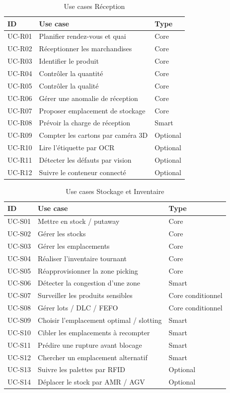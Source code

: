 \begin{longtable}{p{2.2cm}p{9.2cm}p{3cm}}
\caption{Use cases Réception}\\
\toprule
ID & Use case & Type \\
\midrule
UC-R01 & Planifier rendez-vous et quai & Core \\
UC-R02 & Réceptionner les marchandises & Core \\
UC-R03 & Identifier le produit & Core \\
UC-R04 & Contrôler la quantité & Core \\
UC-R05 & Contrôler la qualité & Core \\
UC-R06 & Gérer une anomalie de réception & Core \\
UC-R07 & Proposer emplacement de stockage & Core \\
UC-R08 & Prévoir la charge de réception & Smart \\
UC-R09 & Compter les cartons par caméra 3D & Optional \\
UC-R10 & Lire l'étiquette par OCR & Optional \\
UC-R11 & Détecter les défauts par vision & Optional \\
UC-R12 & Suivre le conteneur connecté & Optional \\
\bottomrule
\end{longtable}

\begin{longtable}{p{2.2cm}p{9.2cm}p{3cm}}
\caption{Use cases Stockage et Inventaire}\\
\toprule
ID & Use case & Type \\
\midrule
UC-S01 & Mettre en stock / putaway & Core \\
UC-S02 & Gérer les stocks & Core \\
UC-S03 & Gérer les emplacements & Core \\
UC-S04 & Réaliser l'inventaire tournant & Core \\
UC-S05 & Réapprovisionner la zone picking & Core \\
UC-S06 & Détecter la congestion d'une zone & Smart \\
UC-S07 & Surveiller les produits sensibles & Core conditionnel \\
UC-S08 & Gérer lots / DLC / FEFO & Core conditionnel \\
UC-S09 & Choisir l'emplacement optimal / slotting & Smart \\
UC-S10 & Cibler les emplacements à recompter & Smart \\
UC-S11 & Prédire une rupture avant blocage & Smart \\
UC-S12 & Chercher un emplacement alternatif & Smart \\
UC-S13 & Suivre les palettes par RFID & Optional \\
UC-S14 & Déplacer le stock par AMR / AGV & Optional \\
\bottomrule
\end{longtable}

